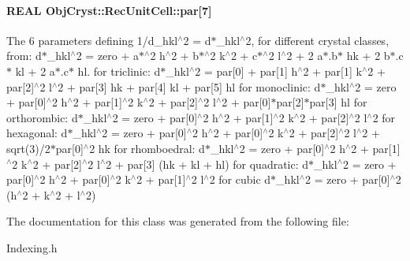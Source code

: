 \paragraph[{par}]{\setlength{\rightskip}{0pt plus 5cm}REAL {\bf ObjCryst::RecUnitCell::par}[7]}\hfill\label{a00069_a624fa31d8c012440df7a3d7637dae182}


The 6 parameters defining 1/d\_\-hkl$^\wedge$2 = d$\ast$\_\-hkl$^\wedge$2, for different crystal classes, from: d$\ast$\_\-hkl$^\wedge$2 = zero + a$\ast$$^\wedge$2 h$^\wedge$2 + b$\ast$$^\wedge$2 k$^\wedge$2 + c$\ast$$^\wedge$2 l$^\wedge$2 + 2 a$\ast$.b$\ast$ hk + 2 b$\ast$.c$\ast$ kl + 2 a$\ast$.c$\ast$ hl. for triclinic: d$\ast$\_\-hkl$^\wedge$2 = par[0] + par[1] h$^\wedge$2 + par[1] k$^\wedge$2 + par[2]$^\wedge$2 l$^\wedge$2 + par[3] hk + par[4] kl + par[5] hl for monoclinic: d$\ast$\_\-hkl$^\wedge$2 = zero + par[0]$^\wedge$2 h$^\wedge$2 + par[1]$^\wedge$2 k$^\wedge$2 + par[2]$^\wedge$2 l$^\wedge$2 + par[0]$\ast$par[2]$\ast$par[3] hl for orthorombic: d$\ast$\_\-hkl$^\wedge$2 = zero + par[0]$^\wedge$2 h$^\wedge$2 + par[1]$^\wedge$2 k$^\wedge$2 + par[2]$^\wedge$2 l$^\wedge$2 for hexagonal: d$\ast$\_\-hkl$^\wedge$2 = zero + par[0]$^\wedge$2 h$^\wedge$2 + par[0]$^\wedge$2 k$^\wedge$2 + par[2]$^\wedge$2 l$^\wedge$2 + sqrt(3)/2$\ast$par[0]$^\wedge$2 hk for rhomboedral: d$\ast$\_\-hkl$^\wedge$2 = zero + par[0]$^\wedge$2 h$^\wedge$2 + par[1]$^\wedge$2 k$^\wedge$2 + par[2]$^\wedge$2 l$^\wedge$2 + par[3] (hk + kl + hl) for quadratic: d$\ast$\_\-hkl$^\wedge$2 = zero + par[0]$^\wedge$2 h$^\wedge$2 + par[0]$^\wedge$2 k$^\wedge$2 + par[1]$^\wedge$2 l$^\wedge$2 for cubic d$\ast$\_\-hkl$^\wedge$2 = zero + par[0]$^\wedge$2 (h$^\wedge$2 + k$^\wedge$2 + l$^\wedge$2) 

The documentation for this class was generated from the following file:\begin{DoxyCompactItemize}
\item 
Indexing.h\end{DoxyCompactItemize}
